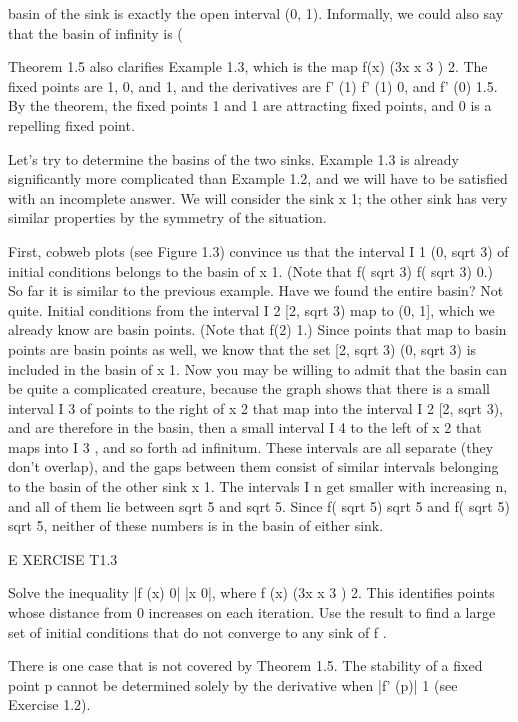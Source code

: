 \documentclass[12pt]{article}
\begin{document}
basin of the sink is exactly the open interval (0, 1). Informally, we could also say that the basin of 
infinity is (


Theorem 1.5 also clarifies Example 1.3, which is the map f(x)  (3x  x 3 )  2. The fixed points are 1, 0, 
and 1, and the derivatives are f' (1)  f' (1)  0, and f' (0)  1.5. By the theorem, the fixed points 1 and 1 
are attracting fixed points, and 0 is a repelling fixed point.

Let’s try to determine the basins of the two sinks. Example 1.3 is already significantly more complicated 
than Example 1.2, and we will have to be satisfied with an incomplete answer. We will consider the sink x  
1; the other sink has very similar properties by the symmetry of the situation.

First, cobweb plots (see Figure 1.3) convince us that the interval I 1  (0, sqrt 3) of initial conditions 
belongs to the basin of x  1. (Note that f( sqrt 3)  f( sqrt 3)  0.) So far it is similar to the previous 
example. Have we found the entire basin? Not quite. Initial conditions from the interval I 2  [2,  sqrt 3) 
map to (0, 1], which we already know are basin points. (Note that f(2)  1.) Since points that map to basin 
points are basin points as well, we know that the set [2,  sqrt 3)  (0, sqrt 3) is included in the basin of x  
1. Now you may be willing to admit that the basin can be quite a complicated creature, because the graph 
shows that there is a small interval I 3 of points to the right of x  2 that map into the interval I 2  [2,  
sqrt 3), and are therefore in the basin, then a small interval I 4 to the left of x  2 that maps into I 3 , 
and so forth ad infinitum. These intervals are all separate (they don’t overlap), and the gaps between them 
consist of similar intervals belonging to the basin of the other sink x  1. The intervals I n get smaller 
with increasing n, and all of them lie between  sqrt 5 and sqrt 5. Since f( sqrt 5)   sqrt 5 and f( sqrt 5)  sqrt 5, 
neither of these numbers is in the basin of either sink.

 

E XERCISE T1.3

Solve the inequality |f (x)  0| 
 |x  0|, where f (x)  (3x  x 3 )  2. This identifies points whose distance from 0 increases on each 
iteration. Use the result to find a large set of initial conditions that do not converge to any sink of f .

There is one case that is not covered by Theorem 1.5. The stability of a fixed point p cannot be determined 
solely by the derivative when |f' (p)|  1 (see Exercise 1.2).
\end{document}
